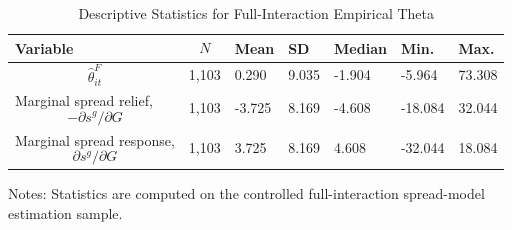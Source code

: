 \begin{table}[H]\centering
\begin{threeparttable}
\caption{Descriptive Statistics for Full-Interaction Empirical Theta}
\label{tab:theta_descriptive_stats}
\scriptsize
\begin{tabularx}{\textwidth}{lYYYYYY}
\toprule
Variable & $$N$$ & Mean & SD & Median & Min. & Max. \\
\midrule
$$\widehat{\theta}^{F}_{it}$$ & 1,103 & 0.290 & 9.035 & -1.904 & -5.964 & 73.308 \\
Marginal spread relief, $$-\partial s^g/\partial G$$ & 1,103 & -3.725 & 8.169 & -4.608 & -18.084 & 32.044 \\
Marginal spread response, $$\partial s^g/\partial G$$ & 1,103 & 3.725 & 8.169 & 4.608 & -32.044 & 18.084 \\
\bottomrule
\end{tabularx}
\begin{tablenotes}[flushleft]\footnotesize
\item Notes: Statistics are computed on the controlled full-interaction spread-model estimation sample.
\end{tablenotes}
\end{threeparttable}
\end{table}
